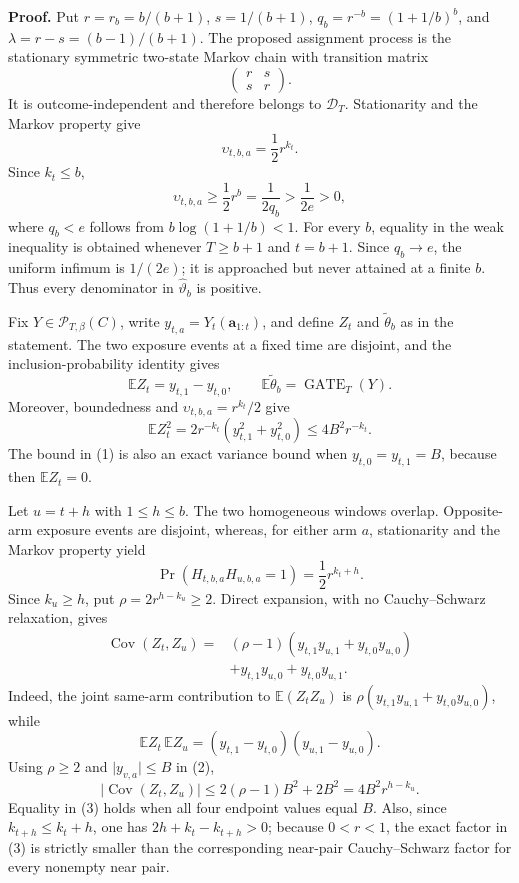 \textbf{Proof.} Put \(r=r_b=b/(b+1)\), \(s=1/(b+1)\), \(q_b=r^{-b}=(1+1/b)^b\), and \(\lambda=r-s=(b-1)/(b+1)\). The proposed assignment process is the stationary symmetric two-state Markov chain with transition matrix
\[
\begin{pmatrix}r&s\\s&r\end{pmatrix}.
\]
It is outcome-independent and therefore belongs to \(\mathcal D_T\). Stationarity and the Markov property give
\[
\upsilon_{t,b,a}=\frac12r^{k_t}.
\]
Since \(k_t\le b\),
\[
\upsilon_{t,b,a}\ge\frac12r^b=\frac{1}{2q_b}>\frac{1}{2e}>0,
\]
where \(q_b<e\) follows from \(b\log(1+1/b)<1\). For every \(b\), equality in the weak inequality is obtained whenever \(T\ge b+1\) and \(t=b+1\). Since \(q_b\to e\), the uniform infimum is \(1/(2e)\); it is approached but never attained at a finite \(b\). Thus every denominator in \(\widehat\vartheta_b\) is positive.

Fix \(Y\in\mathcal P_{T,\beta}(C)\), write \(y_{t,a}=Y_t(\mathbf a_{1:t})\), and define \(Z_t\) and \(\widetilde\theta_b\) as in the statement. The two exposure events at a fixed time are disjoint, and the inclusion-probability identity gives
\[
\mathbb E Z_t=y_{t,1}-y_{t,0},
\qquad
\mathbb E\widetilde\theta_b=\operatorname{GATE}_T(Y).
\]
Moreover, boundedness and \(\upsilon_{t,b,a}=r^{k_t}/2\) give
\[
\mathbb E Z_t^2
=2r^{-k_t}(y_{t,1}^2+y_{t,0}^2)
\le4B^2r^{-k_t}.
\tag{1}
\]
The bound in (1) is also an exact variance bound when \(y_{t,0}=y_{t,1}=B\), because then \(\mathbb E Z_t=0\).

Let \(u=t+h\) with \(1\le h\le b\). The two homogeneous windows overlap. Opposite-arm exposure events are disjoint, whereas, for either arm \(a\), stationarity and the Markov property yield
\[
\Pr(H_{t,b,a}H_{u,b,a}=1)=\frac12r^{k_t+h}.
\]
Since \(k_u\ge h\), put \(\rho=2r^{h-k_u}\ge2\). Direct expansion, with no Cauchy--Schwarz relaxation, gives
\[
\begin{aligned}
\operatorname{Cov}(Z_t,Z_u)
={}&(\rho-1)(y_{t,1}y_{u,1}+y_{t,0}y_{u,0})\\
&+y_{t,1}y_{u,0}+y_{t,0}y_{u,1}.
\end{aligned}
\tag{2}
\]
Indeed, the joint same-arm contribution to \(\mathbb E(Z_tZ_u)\) is \(\rho(y_{t,1}y_{u,1}+y_{t,0}y_{u,0})\), while
\[
\mathbb EZ_t\,\mathbb EZ_u
=(y_{t,1}-y_{t,0})(y_{u,1}-y_{u,0}).
\]
Using \(\rho\ge2\) and \(\lvert y_{v,a}\rvert\le B\) in (2),
\[
\lvert\operatorname{Cov}(Z_t,Z_u)\rvert
\le2(\rho-1)B^2+2B^2
=4B^2r^{h-k_u}.
\tag{3}
\]
Equality in (3) holds when all four endpoint values equal \(B\). Also, since \(k_{t+h}\le k_t+h\), one has \(2h+k_t-k_{t+h}>0\); because \(0<r<1\), the exact factor in (3) is strictly smaller than the corresponding near-pair Cauchy--Schwarz factor for every nonempty near pair.

